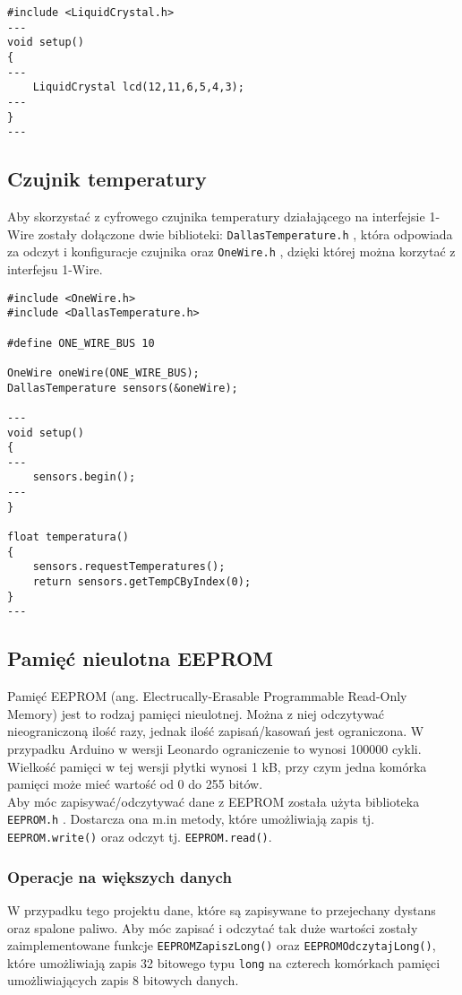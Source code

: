 \begin{lstlisting}[label=list:lcd_setup,caption=Inicjalizacja wyświetlacza,
basicstyle=\footnotesize\ttfamily]
#include <LiquidCrystal.h>
---
void setup()
{
---
    LiquidCrystal lcd(12,11,6,5,4,3);
---
}
---
\end{lstlisting}

\subsection{Czujnik temperatury}

Aby skorzystać z cyfrowego czujnika temperatury działającego na interfejsie 1-Wire zostały dołączone dwie biblioteki: \texttt{DallasTemperature.h} \cite{lib_dallas}, która odpowiada za odczyt i konfiguracje czujnika oraz \texttt{OneWire.h} \cite{lib_onewire}, dzięki której można korzytać z interfejsu 1-Wire.

\begin{lstlisting}[label=list:d18s20_setup,caption=Inicjalizacja czujnika i odczyt temperatury,
basicstyle=\footnotesize\ttfamily]
#include <OneWire.h>
#include <DallasTemperature.h>

#define ONE_WIRE_BUS 10

OneWire oneWire(ONE_WIRE_BUS);
DallasTemperature sensors(&oneWire);

---
void setup()
{
---
    sensors.begin();
---
}

float temperatura() 
{
    sensors.requestTemperatures();
    return sensors.getTempCByIndex(0);
}
---
\end{lstlisting}


\subsection{Pamięć nieulotna EEPROM}
Pamięć EEPROM (ang. Electrucally-Erasable Programmable Read-Only Memory) jest to rodzaj pamięci nieulotnej. Można z niej odczytywać nieograniczoną ilość razy, jednak ilość zapisań/kasowań jest ograniczona. W przypadku Arduino w wersji Leonardo ograniczenie to wynosi 100000 cykli. Wielkość pamięci w tej wersji płytki wynosi 1 kB, przy czym jedna komórka pamięci może mieć wartość od 0 do 255 bitów.\\
Aby móc zapisywać/odczytywać dane z EEPROM została użyta biblioteka \texttt{EEPROM.h} \cite{lib_eeprom}. Dostarcza ona m.in metody, które umożliwiają zapis tj. \texttt{EEPROM.write()} oraz odczyt tj. \texttt{EEPROM.read()}.
\subsubsection{Operacje na większych danych}
W przypadku tego projektu dane, które są zapisywane to przejechany dystans oraz spalone paliwo. Aby móc zapisać i odczytać tak duże wartości zostały zaimplementowane funkcje \texttt{EEPROMZapiszLong()} oraz \texttt{EEPROMOdczytajLong()}, które umożliwiają zapis 32 bitowego typu \texttt{long} na czterech komórkach pamięci umożliwiających zapis 8 bitowych danych.

